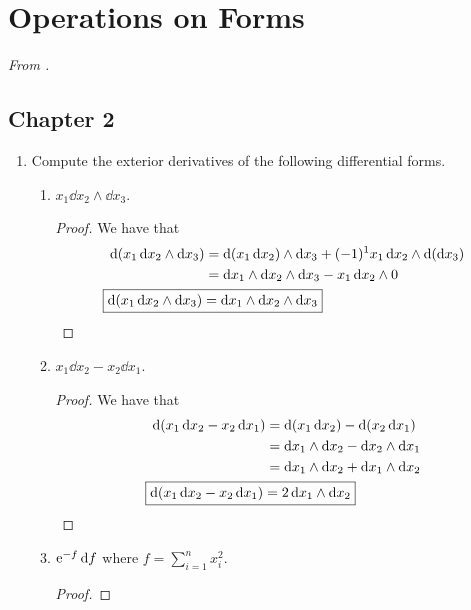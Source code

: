 \documentclass[../psets.tex]{subfiles}
\begin{document}
\section{Operations on Forms}
\emph{From \textcite{bib:DifferentialForms}.}
\subsection*{Chapter 2}
\begin{enumerate}[label={\textbf{2.4.\roman*.}}]
    \item {}Compute the exterior derivatives of the following differential forms.
    \begin{enumerate}
        \item $x_1\dd{x_2}\wedge\dd{x_3}$.
        \begin{proof}
            We have that
            \begin{align*}
                \dd(x_1\dd{x_2}\wedge\dd{x_3}) &= \dd(x_1\dd{x_2})\wedge\dd{x_3}+(-1)^1x_1\dd{x_2}\wedge\dd(\dd{x_3})\\
                &= \dd{x_1}\wedge\dd{x_2}\wedge\dd{x_3}-x_1\dd{x_2}\wedge 0\\
                \Aboxed{\dd(x_1\dd{x_2}\wedge\dd{x_3}) &= \dd{x_1}\wedge\dd{x_2}\wedge\dd{x_3}}
            \end{align*}
        \end{proof}
        \item $x_1\dd{x_2}-x_2\dd{x_1}$.
        \begin{proof}
            We have that
            \begin{align*}
                \dd(x_1\dd{x_2}-x_2\dd{x_1}) &= \dd(x_1\dd{x_2})-\dd(x_2\dd{x_1})\\
                &= \dd{x_1}\wedge\dd{x_2}-\dd{x_2}\wedge\dd{x_1}\\
                &= \dd{x_1}\wedge\dd{x_2}+\dd{x_1}\wedge\dd{x_2}\\
                \Aboxed{\dd(x_1\dd{x_2}-x_2\dd{x_1}) &= 2\dd{x_1}\wedge\dd{x_2}}
            \end{align*}
        \end{proof}
        \item $\e[-f]\dd{f}$ where $f=\sum_{i=1}^nx_i^2$.
        \begin{proof}

\end{proof}
\end{enumerate}
\end{enumerate}
\end{document}
